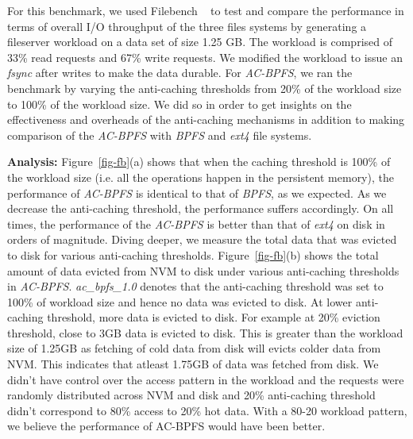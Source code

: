 For this benchmark, we used Filebench ~\cite{filebench} to test and compare the performance in terms of overall I/O throughput of the three files systems by generating a fileserver workload on a data set of size 1.25 GB. The workload is comprised of 33\% read requests and 67\% write requests. We modified the workload to issue an \textit{fsync} after writes to make the data durable. For \textit{AC-BPFS}, we ran the benchmark by varying the anti-caching thresholds from 20\% of the workload size to 100\% of the workload size. We did so in order to get insights on the effectiveness and overheads of the anti-caching mechanisms in addition to making comparison of the \textit{AC-BPFS} with \textit{BPFS} and \textit{ext4} file systems.

\textbf{Analysis:} Figure~\ref{fig-fb}(a) shows that when the caching threshold is 100\% of the workload size (i.e. all the operations happen in the persistent memory), the performance of \textit{AC-BPFS} is identical to that of \textit{BPFS}, as we expected. As we decrease the anti-caching threshold, the performance suffers accordingly. On all times, the performance of the \textit{AC-BPFS} is better than that of \textit{ext4} on disk in orders of magnitude. Diving deeper, we measure the total data that was evicted to disk for various anti-caching thresholds. Figure~\ref{fig-fb}(b) shows the total amount of data evicted from NVM to disk under various anti-caching thresholds in \textit{AC-BPFS}. \textit{ac\_bpfs\_1.0} denotes that the anti-caching threshold was set to 100\% of workload size and hence no data was evicted to disk. At lower anti-caching threshold, more data is evicted to disk. For example at 20\% eviction threshold, close to 3GB data is evicted to disk. This is greater than the workload size of 1.25GB as fetching of cold data from disk will evicts colder data from NVM. This indicates that atleast 1.75GB of data was fetched from disk. We didn't have control over the access pattern in the workload and the requests were randomly distributed across NVM and disk and 20\% anti-caching threshold didn't correspond to 80\% access to 20\% hot data. With a 80-20 workload pattern, we believe the performance of AC-BPFS would have been better.
